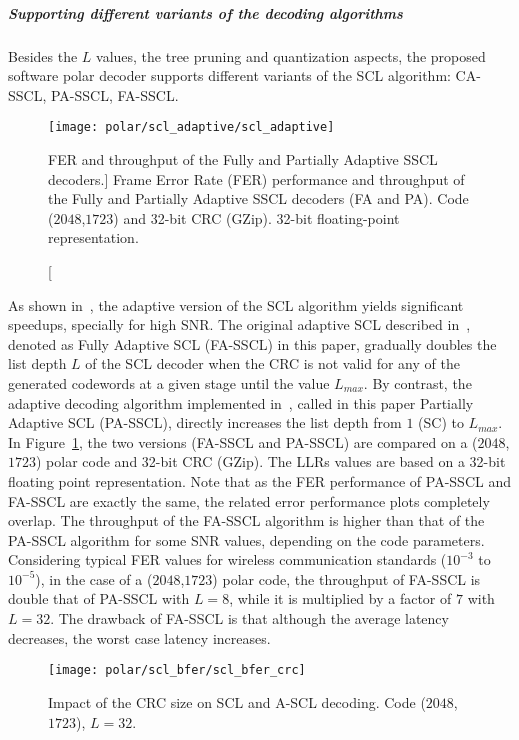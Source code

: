 \subparagraph{Supporting different variants of the decoding algorithms}

Besides the $L$ values, the tree pruning and quantization aspects, the proposed
software polar decoder supports different variants of the SCL algorithm:
CA-SSCL, PA-SSCL, FA-SSCL.

\begin{figure}[htp]
  \centering
  \texttt{[image: polar/scl\_adaptive/scl\_adaptive]}
  \caption
    [FER and throughput of the Fully and Partially Adaptive SSCL decoders.]
    {Frame Error Rate (FER) performance and throughput of the Fully and
    Partially Adaptive SSCL decoders (FA and PA). Code ($2048$,$1723$) and
    32-bit CRC (GZip). 32-bit floating-point representation.}
  \label{plot:polar_scl_adaptive}
\end{figure}

As shown in~\cite{Sarkis2016}, the adaptive version of the SCL algorithm yields
significant speedups, specially for high SNR. The original adaptive SCL
described in~\cite{Li2012}, denoted as Fully Adaptive SCL (FA-SSCL) in this
paper, gradually doubles the list depth $L$ of the SCL decoder when the CRC is
not valid for any of the generated codewords at a given stage until the value
$L_{max}$. By contrast, the adaptive decoding algorithm implemented
in~\cite{Sarkis2016}, called in this paper Partially Adaptive SCL (PA-SSCL),
directly increases the list depth from $1$ (SC) to $L_{max}$. In
Figure~\ref{plot:polar_scl_adaptive}, the two versions (FA-SSCL and PA-SSCL) are
compared on a ($2048$,$1723$) polar code and 32-bit CRC (GZip). The LLRs values
are based on a 32-bit floating point representation. Note that as the FER
performance of PA-SSCL and FA-SSCL are exactly the same, the related error
performance plots completely overlap. The throughput of the FA-SSCL algorithm is
higher than that of the PA-SSCL algorithm for some SNR values, depending on the
code parameters. Considering typical FER values for wireless communication
standards ($10^{-3}$ to $10^{-5}$), in the case of a ($2048$,$1723$) polar code,
the throughput of FA-SSCL is double that of PA-SSCL with $L = 8$, while it is
multiplied by a factor of $7$ with $L=32$. The drawback of FA-SSCL is that
although the average latency decreases, the worst case latency increases.

\begin{figure}[htp]
  \centering
  \texttt{[image: polar/scl\_bfer/scl\_bfer\_crc]}
  \caption{Impact of the CRC size on SCL and A-SCL decoding. Code ($2048$,
    $1723$), $L=32$.}
  \label{plot:polar_scl_bfer_crc}
\end{figure}

